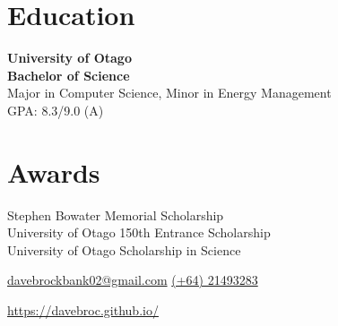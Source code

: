 \documentclass[lighthipster]{simplehipstercv}
\begin{document}
    \begin{minipage}[t]{1\textwidth}
    \section*{Education}
    
    \textbf{University of Otago}\\
    \textbf{Bachelor of Science}\\
    Major in Computer Science, Minor in Energy Management\\
    GPA: 8.3/9.0 (A)\\
    
    \end{minipage}
    \bigskip
    
    \begin{minipage}[t]{1\textwidth}
    \section*{Awards}
    Stephen Bowater Memorial Scholarship\\
    University of Otago 150th Entrance Scholarship\\
    University of Otago Scholarship in Science
    \bigskip
    
    \end{minipage}\hfill
    \bigskip
    \bigskip
    \bigskip
    \bigskip
    \bigskip
\setlength{\parindent}{0pt}

\begin{minipage}[t]{1\textwidth}
\fontfamily{\sfdefault}\selectfont \color{black!70}
{\begin{center}\small 
    \href{mailto:davebrockbank02@gmail.com}{ davebrockbank02@gmail.com}  
    \href{tel:021493283}{ (+64) 21493283}  
 \end{center}
\begin{center}
    \href{https://davebroc.github.io/}{ https://davebroc.github.io/}
\end{center}
}
\end{minipage}
\end{document}
